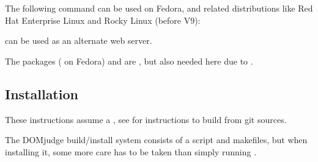 \documentclass[a4paper,10pt,english,openany]{sphinxmanual}
\begin{document}
\sphinxAtStartPar
The following command can be used on Fedora, and related distributions like
Red Hat Enterprise Linux and Rocky Linux (before V9):

\begin{sphinxVerbatim}[commandchars=\\\{\}]
           \PYGZbs{}
            \PYGZbs{}
           
\end{sphinxVerbatim}

\sphinxAtStartPar
{} can be used as an alternate web server.

\sphinxAtStartPar
The packages  ( on Fedora) and  are
{\hyperref[\detokenize{install-judgehost:judgehost-software}]{}}, but also
needed here due to .


\subsection{Installation}
\label{\detokenize{install-domserver:installation}}
\sphinxAtStartPar
These instructions assume a , see {\hyperref[\detokenize{develop:bootstrap}]{}}
for instructions to build from git sources.

\sphinxAtStartPar
The DOMjudge build/install system consists of a 
script and makefiles, but when installing it, some more care has to be
taken than simply running .
\end{document}
